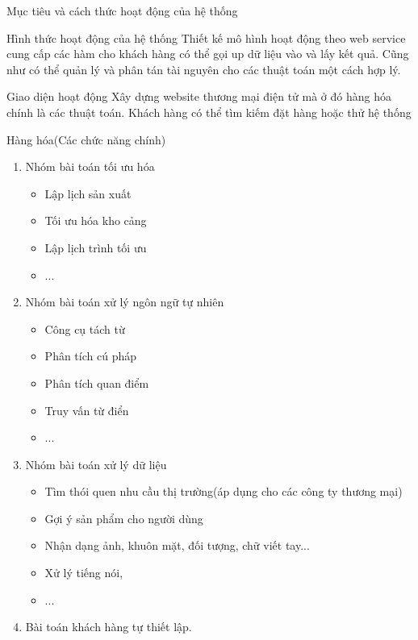 \documentclass{beamer}
\begin{document}
\begin{frame}{Mục tiêu và cách thức hoạt động của hệ thống}

\end{frame}
\begin{frame}{Hình thức hoạt động của hệ thống}
Thiết kế mô hình hoạt động theo web service cung cấp các hàm cho khách hàng có thể gọi up dữ liệu vào và lấy kết quả. Cũng như có thể quản lý và phân tán tài nguyên cho các thuật toán một cách hợp lý.

\end{frame}
\begin{frame}{Giao diện hoạt động}
Xây dựng website thương mại điện tử mà ở đó hàng hóa chính là các thuật toán. Khách hàng có thể tìm kiếm đặt hàng hoặc thử hệ thống
\end{frame}
\begin{frame}{Hàng hóa(Các chức năng chính)}
\begin{enumerate}
\item Nhóm bài toán tối ưu hóa
\begin{itemize}
\item Lập lịch sản xuất
\item Tối ưu hóa kho cảng
\item Lập lịch trình tối ưu
\item ...
\end{itemize}
\item Nhóm bài toán xử lý ngôn ngữ tự nhiên
\begin{itemize}
\item Công cụ tách từ
\item Phân tích cú pháp
\item Phân tích quan điểm
\item Truy vấn từ điển
\item ...
\end{itemize}
\item Nhóm bài toán xử lý dữ liệu
\begin{itemize}
\item Tìm thói quen nhu cầu thị trường(áp dụng cho các công ty thương mại)
\item Gợi ý sản phẩm cho người dùng
\item Nhận dạng ảnh, khuôn mặt, đối tượng, chữ viết tay...
\item Xử lý tiếng nói, 
\item ...
\end{itemize}
\item Bài toán khách hàng tự thiết lập.
\end{enumerate}
\end{frame}
\end{document}
